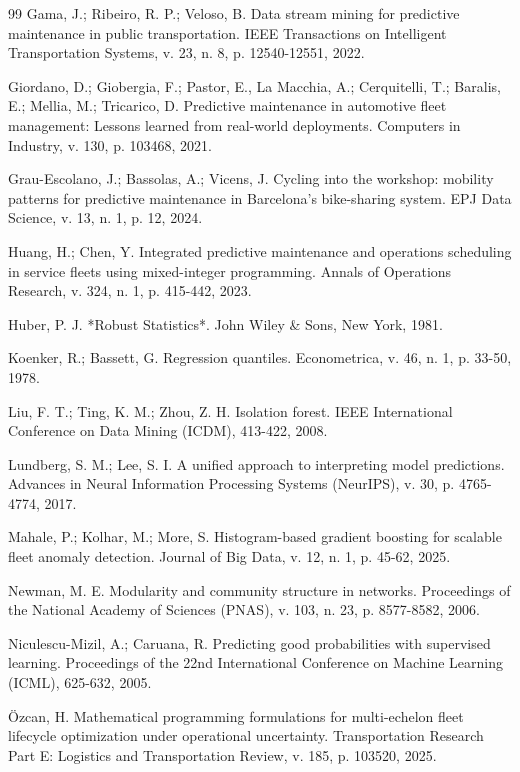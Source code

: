 \documentclass[12pt,a4paper]{article}
\begin{document}
\begin{thebibliography}{99}
 Gama, J.; Ribeiro, R. P.; Veloso, B. Data stream mining for predictive maintenance in public transportation. IEEE Transactions on Intelligent Transportation Systems, v. 23, n. 8, p. 12540-12551, 2022.

 Giordano, D.; Giobergia, F.; Pastor, E., La Macchia, A.; Cerquitelli, T.; Baralis, E.; Mellia, M.; Tricarico, D. Predictive maintenance in automotive fleet management: Lessons learned from real-world deployments. Computers in Industry, v. 130, p. 103468, 2021.

 Grau-Escolano, J.; Bassolas, A.; Vicens, J. Cycling into the workshop: mobility patterns for predictive maintenance in Barcelona's bike-sharing system. EPJ Data Science, v. 13, n. 1, p. 12, 2024.

 Huang, H.; Chen, Y. Integrated predictive maintenance and operations scheduling in service fleets using mixed-integer programming. Annals of Operations Research, v. 324, n. 1, p. 415-442, 2023.

 Huber, P. J. *Robust Statistics*. John Wiley \& Sons, New York, 1981.

 Koenker, R.; Bassett, G. Regression quantiles. Econometrica, v. 46, n. 1, p. 33-50, 1978.

 Liu, F. T.; Ting, K. M.; Zhou, Z. H. Isolation forest. IEEE International Conference on Data Mining (ICDM), 413-422, 2008.

 Lundberg, S. M.; Lee, S. I. A unified approach to interpreting model predictions. Advances in Neural Information Processing Systems (NeurIPS), v. 30, p. 4765-4774, 2017.

 Mahale, P.; Kolhar, M.; More, S. Histogram-based gradient boosting for scalable fleet anomaly detection. Journal of Big Data, v. 12, n. 1, p. 45-62, 2025.

 Newman, M. E. Modularity and community structure in networks. Proceedings of the National Academy of Sciences (PNAS), v. 103, n. 23, p. 8577-8582, 2006.

 Niculescu-Mizil, A.; Caruana, R. Predicting good probabilities with supervised learning. Proceedings of the 22nd International Conference on Machine Learning (ICML), 625-632, 2005.

 Özcan, H. Mathematical programming formulations for multi-echelon fleet lifecycle optimization under operational uncertainty. Transportation Research Part E: Logistics and Transportation Review, v. 185, p. 103520, 2025.


\end{thebibliography}
\end{document}
